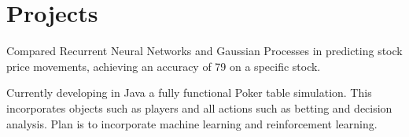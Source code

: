\documentclass[]{deedy-resume-openfont}
\begin{document}
\begin{minipage}[t]{0.61\textwidth}
\section{Projects}
\begin{tightemize} 
\item Compared Recurrent Neural Networks and Gaussian Processes in predicting stock price movements, achieving an accuracy of 79 on a specific stock.
\item Currently developing in Java a fully functional Poker table simulation. This incorporates objects such as players and all actions such as betting and decision analysis. Plan is to incorporate machine learning and reinforcement learning.
\end{tightemize} 

\end{minipage} 
\end{document}
